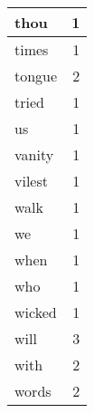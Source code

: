 \begin{center}
\begin{longtable}{l|r}
thou & 1 \\ \hline
times & 1 \\ \hline
tongue & 2 \\ \hline
tried & 1 \\ \hline
us & 1 \\ \hline
vanity & 1 \\ \hline
vilest & 1 \\ \hline
walk & 1 \\ \hline
we & 1 \\ \hline
when & 1 \\ \hline
who & 1 \\ \hline
wicked & 1 \\ \hline
will & 3 \\ \hline
with & 2 \\ \hline
words & 2 \\ \hline
\end{longtable}
\end{center}



\normalsize



